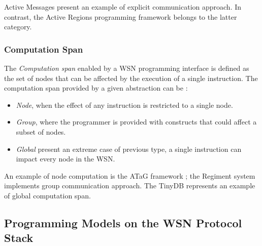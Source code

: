 Active Messages \cite{activemessagesEicken:2001} present an example of
explicit communication approach. In contrast, the Active Regions programming
framework \cite{activeregions:2004} belongs to the latter category.

\subsubsection{Computation Span}

The \emph{Computation span} enabled by a WSN programming interface is defined
as the set of nodes that can be affected by the execution of a single
instruction. The
computation span provided by a given abstraction can be
\cite{mottola_middleware:2008}:

\begin{itemize}
  \item \emph{Node}, when the effect of any instruction is restricted to a
  single node.
  \item \emph{Group}, where the programmer is provided with constructs that
  could affect a subset of nodes. 
  \item \emph{Global} present an extreme case of previous type, a single
  instruction can impact every node in the WSN.
\end{itemize}

An example of node computation is the ATaG framework \cite{atag:2005}; the
Regiment system \cite{regiment:2007} implements group communication approach. The
TinyDB \cite{madden_TinyDB:2005} represents an example of global computation
span.

\subsection{Programming Models on the WSN Protocol Stack}

